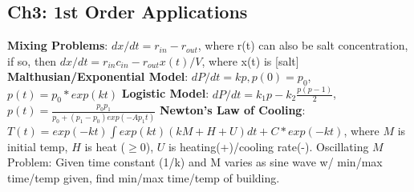 \subsection*{Ch3: 1st Order Applications}
\textbf{Mixing Problems}: 
$dx/dt = r_{in} - r_{out}$, where r(t) can also be salt concentration, if so, then 
$dx/dt = r_{in}c_{in} - r_{out}x(t)/V$, where x(t) is [salt]
\textbf{Malthusian/Exponential Model}: 
$dP/dt = kp, p(0)=p_0$, $p(t) = p_0*exp(kt)$ 
\textbf{Logistic Model}:
$dP/dt = k_1p-k_2\frac{p(p-1)}{2}$, $p(t) = \frac{p_0p_1}{p_0 + (p_1-p_0)exp(-Ap_1t)}$
\textbf{Newton's Law of Cooling}: 
$T(t) = exp(-kt)\int exp(kt)(kM + H + U)dt + C*exp(-kt)$, where
$M$ is initial temp, $H$ is heat ($\geq 0$), $U$ is heating(+)/cooling rate(-). 
Oscillating $M$ Problem: Given time constant (1/k) and M varies as sine wave w/ min/max time/temp given, find min/max time/temp of building. 
